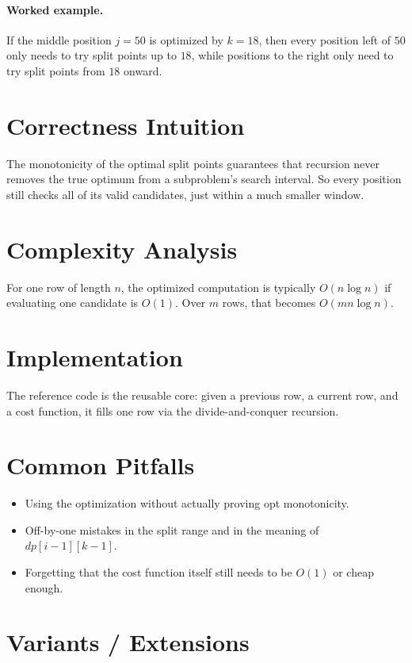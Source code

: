 \paragraph{Worked example.}
If the middle position \(j = 50\) is optimized by \(k = 18\), then every position left of \(50\) only needs to try
split points up to \(18\), while positions to the right only need to try split points from \(18\) onward.

\section*{Correctness Intuition}

The monotonicity of the optimal split points guarantees that recursion never removes the true optimum from a subproblem's
search interval. So every position still checks all of its valid candidates, just within a much smaller window.

\section*{Complexity Analysis}

For one row of length \(n\), the optimized computation is typically \(O(n \log n)\) if evaluating one candidate is
\(O(1)\). Over \(m\) rows, that becomes \(O(m n \log n)\).

\section*{Implementation}

The reference code is the reusable core: given a previous row, a current row, and a cost function, it fills one row via
the divide-and-conquer recursion.

\section*{Common Pitfalls}

\begin{itemize}
  \item Using the optimization without actually proving opt monotonicity.
  \item Off-by-one mistakes in the split range and in the meaning of \(dp[i-1][k-1]\).
  \item Forgetting that the cost function itself still needs to be \(O(1)\) or cheap enough.
\end{itemize}

\section*{Variants / Extensions}

